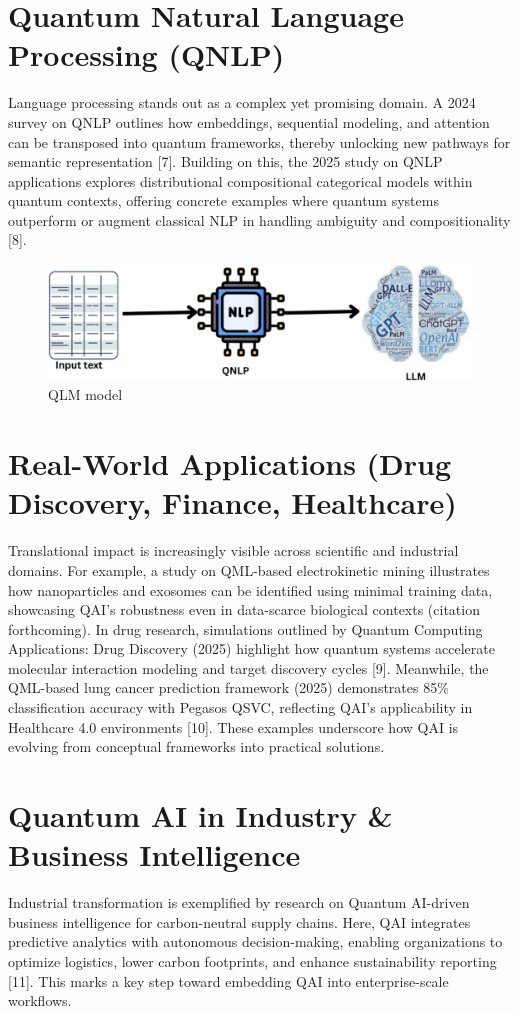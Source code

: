 \section{Quantum Natural Language Processing (QNLP)}
\hspace*{0.3in}Language processing stands out as a complex yet promising domain. A 2024 survey on QNLP outlines how embeddings, sequential modeling, and attention can be transposed into quantum frameworks, thereby unlocking new pathways for semantic representation [7]. Building on this, the 2025 study on QNLP applications explores distributional compositional categorical models within quantum contexts, offering concrete examples where quantum systems outperform or augment classical NLP in handling ambiguity and compositionality [8].
\begin{figure}[htbp]
	\centering
	\includegraphics[width=1\linewidth]{qnlp.png}
	\caption{QLM model}
	\label{fig:enter-label}
\end{figure}
\section{Real-World Applications (Drug Discovery, Finance, Healthcare)}
\hspace*{0.3in}Translational impact is increasingly visible across scientific and industrial domains. For example, a study on QML-based electrokinetic mining illustrates how nanoparticles and exosomes can be identified using minimal training data, showcasing QAI’s robustness even in data-scarce biological contexts (citation forthcoming). In drug research, simulations outlined by Quantum Computing Applications: Drug Discovery (2025) highlight how quantum systems accelerate molecular interaction modeling and target discovery cycles [9]. Meanwhile, the QML-based lung cancer prediction framework (2025) demonstrates 85\% classification accuracy with Pegasos QSVC, reflecting QAI’s applicability in Healthcare 4.0 environments [10]. These examples underscore how QAI is evolving from conceptual frameworks into practical solutions.
\section{Quantum AI in Industry \& Business Intelligence}
\hspace*{0.3in}Industrial transformation is exemplified by research on Quantum AI-driven business intelligence for carbon-neutral supply chains. Here, QAI integrates predictive analytics with autonomous decision-making, enabling organizations to optimize logistics, lower carbon footprints, and enhance sustainability reporting [11]. This marks a key step toward embedding QAI into enterprise-scale workflows.
